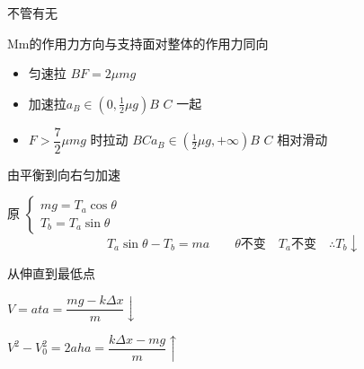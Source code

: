 
不管有无\unclear{$\mu$}


Mm的作用力方向与支持面对整体的作用力同向 %
\begin{problem}
\begin{solution}
\begin{itemize}
\item 匀速拉 $B$\quad $F=2\mu mg$ %
\item 加速拉\quad $a_B\in(0,\tfrac12\mu g)$\quad $B$ $C$ 一起
\item $F>\dfrac{7}{2}\mu mg$ 时拉动 $B$$C$\quad $a_B\in(\tfrac12\mu g,+\infty)$\quad $B$ $C$ 相对滑动 %
\end{itemize}
\end{solution}
\end{problem}
\begin{problem}[2]
由平衡到向右匀加速
\begin{solution}
原
$\begin{cases} mg=T_a\cos\theta\\ T_b=T_a\sin\theta \end{cases}$
\[ T_a\sin\theta-T_b=ma\qquad\theta\text{不变}\quad T_a\text{不变}\quad\therefore T_b\downarrow \]
\end{solution}
\end{problem}
\begin{problem}
从伸直到最低点
\begin{solution}
$V=at$\qquad $a=\dfrac{mg-k\Delta x}{m}\downarrow$

$V^2-V_0^2=2ah$\qquad $a=\dfrac{k\Delta x-mg}{m}\uparrow$
\end{solution}
\end{problem}
